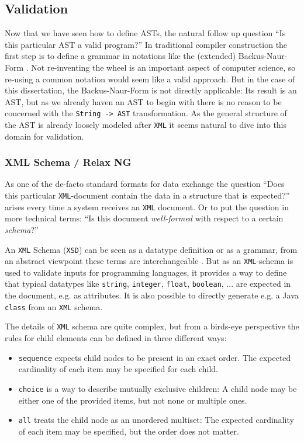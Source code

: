 \subsection{Validation}

Now that we have seen how to define ASTs, the natural follow up question \enquote{Is this particular AST a valid program?} In traditional compiler construction the first step is to define a grammar in notations like the (extended) Backus-Naur-Form \cite{knuth_backus_1964}. Not re-inventing the wheel is an important aspect of computer science, so re-using a common notation would seem like a valid approach. But in the case of this dissertation, the Backus-Naur-Form is not directly applicable: Its result is an AST, but as we already haven an AST to begin with there is no reason to be concerned with the \texttt{String -> AST} transformation. As the general structure of the AST is already loosely modeled after \texttt{XML} it seems natural to dive into this domain for validation.

\subsubsection{XML Schema / Relax NG}

As one of the de-facto standard formats for data exchange the question \enquote{Does this particular \texttt{XML}-document contain the data in a structure that is expected?} arises every time a system receives an \texttt{XML} document. Or to put the question in more technical terms: \enquote{Is this document \textit{well-formed} with respect to a certain \textit{schema}?}

An \texttt{XML} Schema (\texttt{XSD}) \cite{xml_schema} can be seen as a datatype definition or as a grammar, from an abstract viewpoint these terms are interchangeable \cite[Chapter 5.3.4 \enquote{XML and Document Type Definitions}]{hopcroft_formal_languages}. But as an \texttt{XML}-schema is used to validate inputs for programming languages, it provides a way to define that typical datatypes like \texttt{string}, \texttt{integer}, \texttt{float}, \texttt{boolean}, ... are expected in the document, e.g. as attributes. It is also possible to directly generate e.g. a Java \texttt{class} from an \texttt{XML} schema.

The details of \texttt{XML} schema are quite complex, but from a birds-eye perspective the rules for child elements can be defined in three different ways:

\begin{itemize}
\item \texttt{sequence} expects child nodes to be present in an exact order. The expected cardinality of each item may be specified for each child.
\item \texttt{choice} is a way to describe mutually exclusive children: A child node may be either one of the provided items, but not none or multiple ones.
\item \texttt{all} treats the child node as an unordered multiset: The expected cardinality of each item may be specified, but the order does not matter.
\end{itemize}

